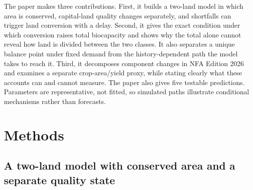 \documentclass[preprint,12pt,authoryear]{elsarticle}
\begin{document}
The paper makes three contributions. First, it builds a two-land model in which area is conserved, capital-land quality changes separately, and shortfalls can trigger land conversion with a delay. Second, it gives the exact condition under which conversion raises total biocapacity and shows why the total alone cannot reveal how land is divided between the two classes. It also separates a unique balance point under fixed demand from the history-dependent path the model takes to reach it. Third, it decomposes component changes in NFA Edition 2026 and examines a separate crop-area/yield proxy, while stating clearly what these accounts can and cannot measure. The paper also gives five testable predictions. Parameters are representative, not fitted, so simulated paths illustrate conditional mechanisms rather than forecasts.\section{Methods}\label{sec:model}

\subsection{A two-land model with conserved area and a separate quality state}\label{sec:equations}
\end{document}
